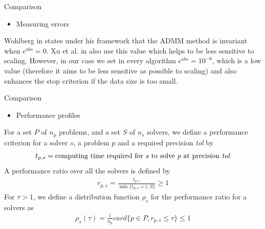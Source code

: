 \documentclass[8pt,red]{beamer}
\theoremstyle{plain}
\theoremstyle{definition}
\theoremstyle{remark}
\begin{document}
\begin{frame}{Comparison}
\begin{itemize}
\item Measuring errors
\end{itemize}
Wohlberg in \citep{wohlberg2017admm} states under his framework that the ADMM method is invariant when $\epsilon^{abs} = 0$. Xu et al. in \citep{xu2016adaptive} also use this value which helps to be less sensitive to scaling. However, in our case we set in every algorithm $\epsilon^{abs} = 10^{-6}$, which is a low value (therefore it aims to be less sensitive as possible to scaling) and also enhances the stop criterion if the data size is too small.
\end{frame}

\begin{frame}{Comparison}
\begin{itemize}
\item Performance profiles
\end{itemize}
For a set $P$ of $n_{p}$ problems, and a set $S$ of $n_{s}$ solvers, we define a performance criterion for a solver $s$, a problem $p$ and a required precision \textit{tol} by
\begin{align}
	t_{p,s} = \text{computing time required for } s \text{ to solve } p \text{ at precision \textit{tol}}
\end{align}
A performance ratio over all the solvers is defined by
\begin{align}
	r_{p,s} = \frac{t_{p,s}}{\min \lbrace t_{p,s}, s \in S \rbrace} \geq 1
\end{align}
For $\tau > 1$, we define a distribution function $\rho_{s}$ for the performance ratio for a solvers as
\begin{align}
	\rho_{s}(\tau) = \frac{1}{n_{p}} card \lbrace p \in P, r_{p,s} \leq \tau \rbrace \leq 1
\end{align}
\end{frame}
\end{document}
